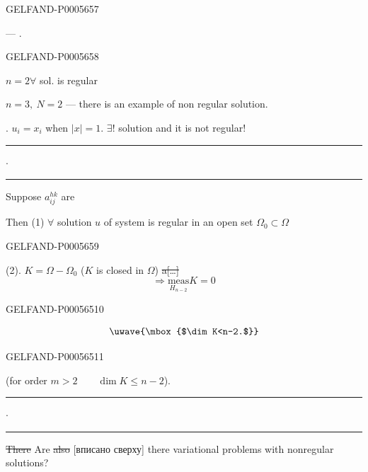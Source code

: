 \begin{GelfandAdjacentEvidence}{GELFAND-P000565}{7}

 — .
\qquad{}
\end{GelfandAdjacentEvidence}
\begin{GelfandAdjacentEvidence}{GELFAND-P000565}{8}

\underline{\(n=2\)}\qquad \(\forall\) sol. is regular

\underline{\(n=3,\ N=2\)} — there is an example of non regular solution.

. \(u_i=x_i\) when \(|x|=1\).
\(\exists!\) solution and it is not regular!

\noindent\hfill\rule{1.1cm}{.32pt}\enspace\(\cdot\)\enspace\rule{.9cm}{.32pt}\par
Suppose \(a_{ij}^{hk}\) are 

Then (1) \(\forall\) solution \(u\) of system is regular in an open set \(\Omega_0\subset\Omega\)
\end{GelfandAdjacentEvidence}
\begin{GelfandAdjacentEvidence}{GELFAND-P000565}{9}

(2). \(K=\Omega-\Omega_0\) (\(K\) is closed in \(\Omega\)) \sout{a[…]}
\[
\Rightarrow\underset{H_{n-2}}{\mathrm{meas}} K=0
\]
\end{GelfandAdjacentEvidence}
\begin{GelfandAdjacentEvidence}{GELFAND-P000565}{10}

\[
\uwave{\mbox{$\dim K<n-2.$}}
\]
\end{GelfandAdjacentEvidence}
\begin{GelfandAdjacentEvidence}{GELFAND-P000565}{11}

(for order \(m>2\qquad\dim K\leqslant n-2\)).

\noindent\hfill\rule{1.1cm}{.32pt}\enspace\(\cdot\)\enspace\rule{.9cm}{.32pt}\par
\sout{There} Are \sout{also} [вписано сверху] there variational problems with nonregular solutions?
\end{GelfandAdjacentEvidence}

